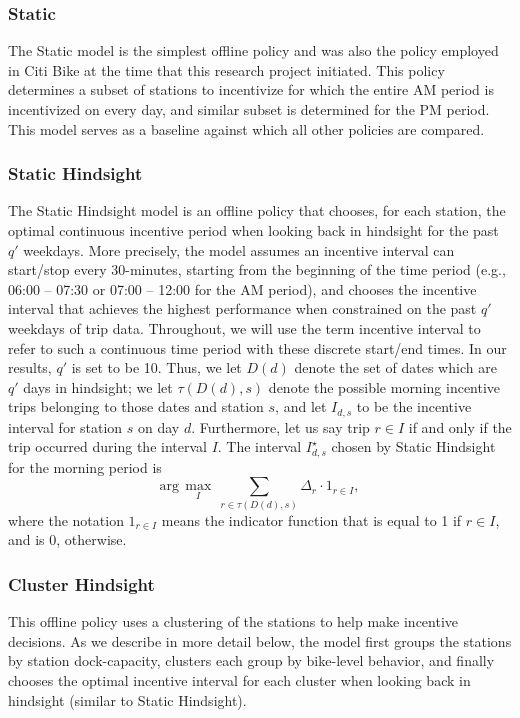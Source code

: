 \subsubsection{Static}
The Static model is the simplest offline policy and was also the policy employed in Citi Bike at the time that this research project initiated. This policy determines a subset of stations to incentivize for which  the entire AM period is incentivized on every day, and similar subset is determined for the PM period. This model serves as a baseline against which all other policies are compared.

\subsubsection{Static Hindsight} 
The Static Hindsight model is an offline policy that chooses, for each station, the optimal continuous incentive period when looking back in hindsight for the past $q'$ weekdays. More precisely, the model assumes an incentive interval can start/stop every 30-minutes, starting from the beginning of the time period (e.g., 06:00 -- 07:30 or 07:00 -- 12:00 for the AM period), and chooses the incentive interval that achieves the highest performance when constrained on the past $q'$ weekdays of trip data. Throughout, we will use the term incentive interval to refer to such a continuous time period with these discrete start/end times. In our results, $q'$ is set to be 10. Thus, we let $D(d)$ denote the set of dates which are $q'$ days in hindsight;
we let $\tau(D(d), s)$ denote the possible morning incentive trips belonging to those dates and station $s$, and let $I_{d,s}$ to be the incentive interval for station $s$ on day $d$. Furthermore, let us say trip $r \in I$ if and only if the trip occurred during the interval $I$. The interval $I_{d,s}^\star$ chosen by Static Hindsight for the morning period is
\begin{equation}
\text{arg}\,\max\limits_{I}\ \sum_{r \in \tau(D(d), s)} \Delta_{r} \cdot 1_{r \in I} ,
\end{equation}
where the notation $1_{r \in I}$ means the indicator function that is equal to 1 if $r \in I$, and is 0, otherwise.

\subsubsection{Cluster Hindsight}
This offline policy uses a clustering of the stations to help make incentive decisions. As we describe in more detail below, the model first groups the stations by station dock-capacity, clusters each group by bike-level behavior, and finally chooses the optimal incentive interval for each cluster when looking back in hindsight (similar to Static Hindsight). 


